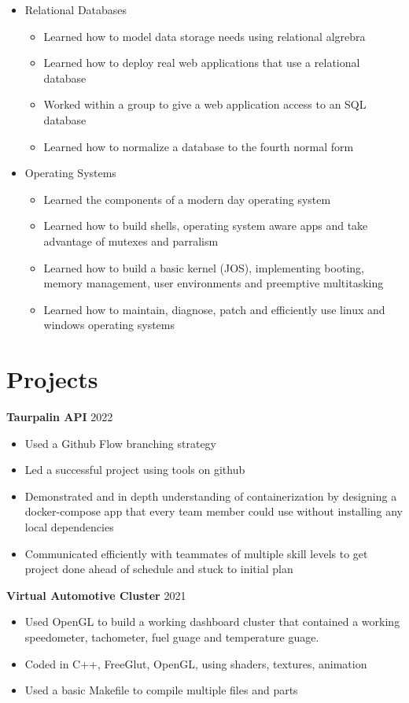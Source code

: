 \documentclass[12pt,letterpaper]{article}
\begin{document}
\begin{itemize}
		\item Relational Databases
		\begin{itemize}
			\item Learned how to model data storage needs using relational algrebra
			\item Learned how to deploy real web applications that use a relational database
			\item Worked within a group to give a web application access to an SQL database
			\item Learned how to normalize a database to the fourth normal form
		\end{itemize}

		\item Operating Systems
		\begin{itemize}
			\item Learned the components of a modern day operating system
			\item Learned how to build shells, operating system aware apps and take advantage of mutexes and parralism
			\item Learned how to build a basic kernel (JOS), implementing booting, memory management, user environments and preemptive multitasking
			\item Learned how to maintain, diagnose, patch and efficiently use linux and windows operating systems
		\end{itemize}

	\end{itemize}

	\section*{Projects}

	\noindent \textbf{Taurpalin API}
	{\hfill 2022}
	\begin{itemize}
		\item Used a Github Flow branching strategy 
		\item Led a successful project using tools on github
		\item Demonstrated and in depth understanding of containerization by designing a docker-compose app that every team member could use without installing any local dependencies
		\item Communicated efficiently with teammates of multiple skill levels to get project done ahead of schedule and stuck to initial plan
	\end{itemize}

	\noindent \textbf{Virtual Automotive Cluster}
	{\hfill 2021}
	\begin{itemize}
		\item Used OpenGL to build a working dashboard cluster that contained a working speedometer, tachometer, fuel guage and temperature guage.
		\item Coded in C++, FreeGlut, OpenGL, using shaders, textures, animation
		\item Used a basic Makefile to compile multiple files and parts
	\end{itemize}
\end{document}
